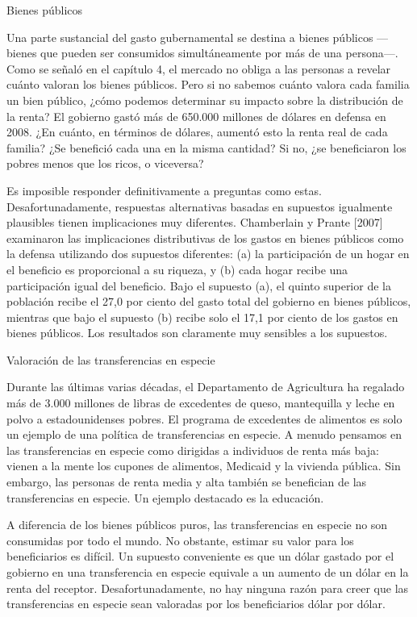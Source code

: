 \documentclass[10pt,a4paper]{article}
\begin{document}
Bienes públicos

Una parte sustancial del gasto gubernamental se destina a bienes públicos —bienes que pueden ser consumidos simultáneamente por más de una persona—. Como se señaló en el capítulo 4, el mercado no obliga a las personas a revelar cuánto valoran los bienes públicos. Pero si no sabemos cuánto valora cada familia un bien público, ¿cómo podemos determinar su impacto sobre la distribución de la renta? El gobierno gastó más de 650.000 millones de dólares en defensa en 2008. ¿En cuánto, en términos de dólares, aumentó esto la renta real de cada familia? ¿Se benefició cada una en la misma cantidad? Si no, ¿se beneficiaron los pobres menos que los ricos, o viceversa?

Es imposible responder definitivamente a preguntas como estas. Desafortunadamente, respuestas alternativas basadas en supuestos igualmente plausibles tienen implicaciones muy diferentes. Chamberlain y Prante [2007] examinaron las implicaciones distributivas de los gastos en bienes públicos como la defensa utilizando dos supuestos diferentes: (a) la participación de un hogar en el beneficio es proporcional a su riqueza, y (b) cada hogar recibe una participación igual del beneficio. Bajo el supuesto (a), el quinto superior de la población recibe el 27,0 por ciento del gasto total del gobierno en bienes públicos, mientras que bajo el supuesto (b) recibe solo el 17,1 por ciento de los gastos en bienes públicos. Los resultados son claramente muy sensibles a los supuestos.

Valoración de las transferencias en especie

Durante las últimas varias décadas, el Departamento de Agricultura ha regalado más de 3.000 millones de libras de excedentes de queso, mantequilla y leche en polvo a estadounidenses pobres. El programa de excedentes de alimentos es solo un ejemplo de una política de transferencias en especie. A menudo pensamos en las transferencias en especie como dirigidas a individuos de renta más baja: vienen a la mente los cupones de alimentos, Medicaid y la vivienda pública. Sin embargo, las personas de renta media y alta también se benefician de las transferencias en especie. Un ejemplo destacado es la educación.

A diferencia de los bienes públicos puros, las transferencias en especie no son consumidas por todo el mundo. No obstante, estimar su valor para los beneficiarios es difícil. Un supuesto conveniente es que un dólar gastado por el gobierno en una transferencia en especie equivale a un aumento de un dólar en la renta del receptor. Desafortunadamente, no hay ninguna razón para creer que las transferencias en especie sean valoradas por los beneficiarios dólar por dólar.
\end{document}
